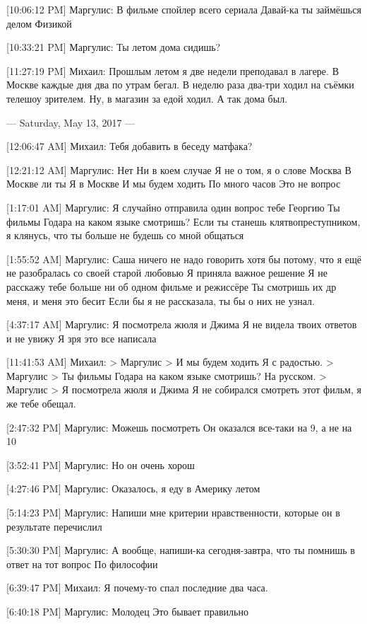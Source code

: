 \documentclass{article}
\begin{document}
[10:06:12 PM] Маргулис:
В фильме спойлер всего сериала
 Давай-ка ты займёшься делом
 Физикой

[10:33:21 PM] Маргулис:
Ты летом дома сидишь?

[11:27:19 PM] Михаил:
Прошлым летом я две недели преподавал в лагере. В Москве каждые дня два по утрам бегал. В неделю раза два-три ходил на съёмки телешоу зрителем. Ну, в магазин за едой ходил. А так дома был.

--- Saturday, May 13, 2017 ---

[12:06:47 AM] Михаил:
Тебя добавить в беседу матфака?

[12:21:12 AM] Маргулис:
Нет
 Ни в коем случае
 Я не о том, я о слове Москва
 В Москве ли ты
 Я в Москве
 И мы будем ходить
 По много часов
 Это не вопрос

[1:17:01 AM] Маргулис:
Я случайно отправила один вопрос тебе Георгию
 Ты фильмы Годара на каком языке смотришь?
 Если ты станешь клятвопреступником, я клянусь, что ты больше не будешь со мной общаться

[1:55:52 AM] Маргулис:
Саша ничего не надо говорить хотя бы потому, что я ещё не разобралась со своей старой любовью
 Я приняла важное решение
 Я не расскажу тебе больше ни об одном фильме и режиссёре
 Ты смотришь их др меня, и меня это бесит
 Если бы я не рассказала, ты бы о них не узнал.

[4:37:17 AM] Маргулис:
Я посмотрела жюля и Джима
 Я не видела твоих ответов и не увижу
 Я зря это все написала

[11:41:53 AM] Михаил:
> Маргулис
> И мы будем ходить
Я с радостью.
> Маргулис
> Ты фильмы Годара на каком языке смотришь?
На русском.
> Маргулис
> Я посмотрела жюля и Джима
Я не собирался смотреть этот фильм, я же тебе обещал.

[2:47:32 PM] Маргулис:
Можешь посмотреть
Он оказался все-таки на 9, а не на 10

[3:52:41 PM] Маргулис:
Но он очень хорош

[4:27:46 PM] Маргулис:
Оказалось, я еду в Америку летом

[5:14:23 PM] Маргулис:
Напиши мне критерии нравственности, которые он в результате перечислил

[5:30:30 PM] Маргулис:
А вообще, напиши-ка сегодня-завтра, что ты помнишь в ответ на тот вопрос
 По философии

[6:39:47 PM] Михаил:
Я почему-то спал последние два часа.

[6:40:18 PM] Маргулис:
Молодец
 Это бывает правильно
\end{document}
